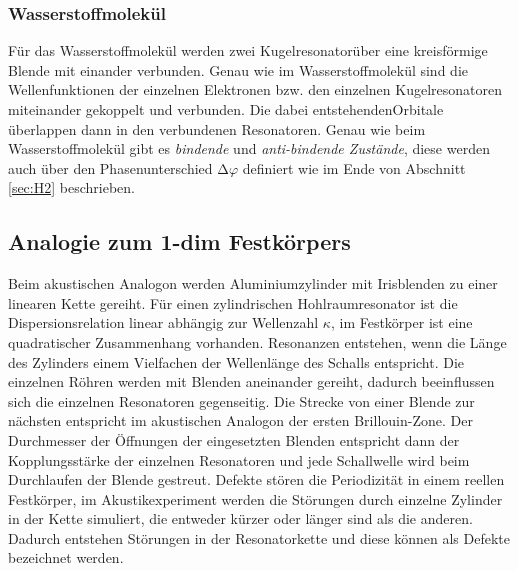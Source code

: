 \subsubsection{Wasserstoffmolekül}
\label{sec:ana-H2}

Für das Wasserstoffmolekül werden zwei Kugelresonatorüber eine kreisförmige Blende mit einander verbunden. Genau wie im Wasserstoffmolekül sind die Wellenfunktionen der einzelnen Elektronen bzw. den einzelnen Kugelresonatoren miteinander gekoppelt und verbunden. Die dabei entstehendenOrbitale überlappen dann in den verbundenen Resonatoren. Genau wie beim Wasserstoffmolekül gibt es \textit{bindende} und \textit{anti-bindende Zustände}, diese werden auch über den Phasenunterschied $\increment \varphi$ definiert wie im Ende von Abschnitt \ref{sec:H2} beschrieben.

\subsection{Analogie zum 1-dim Festkörpers}
\label{ana-fest}

Beim akustischen Analogon werden Aluminiumzylinder mit Irisblenden zu einer linearen Kette gereiht. Für einen zylindrischen Hohlraumresonator ist die Dispersionsrelation linear abhängig zur Wellenzahl $\kappa$, im Festkörper ist eine quadratischer Zusammenhang vorhanden. Resonanzen entstehen, wenn die Länge des Zylinders einem Vielfachen der Wellenlänge des Schalls entspricht. Die einzelnen Röhren werden mit Blenden aneinander gereiht, dadurch beeinflussen sich die einzelnen Resonatoren gegenseitig. Die Strecke von einer Blende zur nächsten entspricht im akustischen Analogon der ersten Brillouin-Zone. Der Durchmesser der Öffnungen der eingesetzten Blenden entspricht dann der Kopplungsstärke der einzelnen Resonatoren und jede Schallwelle wird beim Durchlaufen der Blende gestreut. Defekte stören die Periodizität in einem reellen Festkörper, im Akustikexperiment werden die Störungen durch einzelne Zylinder in der Kette simuliert, die entweder kürzer oder länger sind als die anderen. Dadurch entstehen Störungen in der Resonatorkette und diese können als Defekte bezeichnet werden.